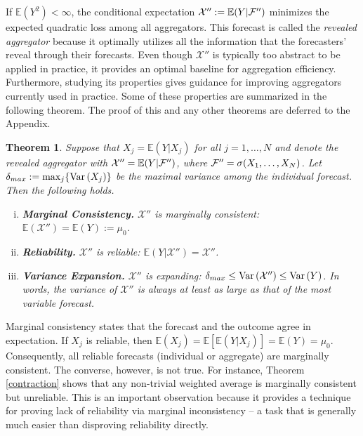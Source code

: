 \documentclass[11pt]{article}
\newcommand{\E}{\mathbb{E}}
\newtheorem{theorem}{Theorem}[section]
\theoremstyle{definition}
\theoremstyle{definition}
\def\F{{\cal F}}
\def\E{{\mathbb E}}
\def\Var{{\rm Var}\,}
\begin{document}
If $\E\left(Y^2\right) < \infty$, the conditional expectation
$\mathcal{X}'' := \E(Y | \F'')$ minimizes the expected quadratic loss
among all aggregators. This forecast is called the \textit{revealed
aggregator} because it optimally utilizes all the information that the
forecasters' reveal through their forecasts. Even though
$\mathcal{X}'' $ is typically too abstract to be applied in practice,
it provides an optimal baseline for aggregation
efficiency. Furthermore, studying its properties gives guidance for
improving aggregators currently used in practice. Some of these
properties are summarized in the following theorem. The proof of this
and any other theorems are deferred to the Appendix.



\begin{theorem} \label{optimal}
Suppose that $X_j = \E(Y | X_j)$ for all $j = 1, \dots, N$ and denote the revealed aggregator with $\mathcal{X}'' = \E(Y | \F'')$, where $\F'' = \sigma(X_1, \dots, X_N)$. 
Let $\delta_{max} := \max_j \{ \Var(X_j)  \}$ be the maximal variance among the individual forecast.
 Then the following holds.
\begin{enumerate}[i)] \label{properties}
\item \textbf{Marginal Consistency.} $\mathcal{X}''$ is marginally consistent:  $\E(\mathcal{X}'') = \E(Y) :=  \mu_0$.
\item \textbf{Reliability.} $\mathcal{X}''$ is reliable: $\E(Y|\mathcal{X}'') = \mathcal{X}''$. 
\item \textbf{Variance Expansion.} $\mathcal{X}''$ is expanding: $\delta_{max} \leq \Var(\mathcal{X}'') \leq \Var(Y)$. In words, the variance of $\mathcal{X}''$ is always at least as large as that of the most variable forecast. 
\end{enumerate}
\end{theorem}
Marginal consistency states that the forecast and the outcome agree in expectation. If $X_j$ is reliable, then $\E(X_j) = \E[\E(Y|X_j)] = \E(Y) = \mu_0$. Consequently, all reliable forecasts (individual or aggregate) are marginally consistent. The converse, however, is not true. For instance, Theorem \ref{contraction} shows that any non-trivial weighted average is marginally consistent but unreliable. This is an important observation because it provides a technique for proving lack of reliability via marginal inconsistency -- a task that is generally much easier than disproving reliability directly.
\end{document}
